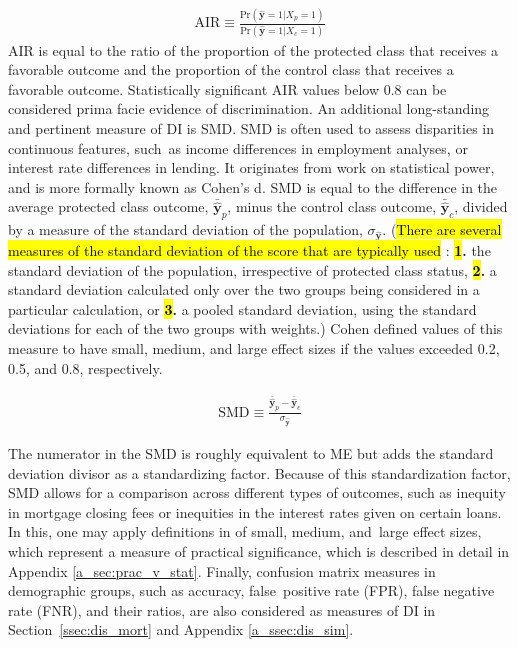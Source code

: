 \documentclass[information,article,accept,moreauthors,pdftex]{Definitions/mdpi}
\begin{document}
{{{\begin{equation}
\label{eq:air}
\begin{aligned}
\text{AIR} \equiv \frac{\text{Pr}(\hat{\mathbf{y}} = 1 | X_p = 1)}{\text{Pr}(\hat{\mathbf{y}} = 1| X_c = 1)}
\end{aligned}
\end{equation}
 AIR is equal to the ratio of the proportion of the protected class that receives a favorable outcome and the proportion of the control class that receives a favorable outcome. Statistically significant AIR values below 0.8 can be considered {prima facie} evidence of discrimination. An additional long-standing and pertinent measure of DI is SMD. SMD is often used to assess disparities in continuous features, such~as income differences in employment analyses, or interest rate differences in lending. It originates from work on statistical power, and is more formally known as {Cohen’s d}. SMD is equal to the difference in the average protected class outcome, $\bar{\hat{\mathbf{y}}}_p$, minus the control class outcome, $\bar{\hat{\mathbf{y}}}_c$, divided by a measure of the standard deviation of the population, $\sigma_{\hat{\mathbf{y}}}$. ({\hl{There are several measures of the standard deviation of the score that are typically used}%
: \textbf{\hl{1}.} the standard deviation of the population, irrespective of protected class status, \textbf{\hl{2}.} a standard deviation calculated only over the two groups being considered in a particular calculation, or \textbf{\hl{3}.} a pooled standard deviation, using the standard deviations for each of the two groups with weights.}) Cohen defined values of this measure to have {small}, {medium}, and {large} effect sizes if the values exceeded 0.2, 0.5, and 0.8, respectively. %

\begin{equation}
\label{eq:smd}
\begin{aligned}
\text{SMD} \equiv \frac{\bar{\hat{\mathbf{y}}}_p - \bar{\hat{\mathbf{y}}}_c}{ \sigma_{\hat{\mathbf{y}}}}
\end{aligned}
\end{equation}

 The numerator in the SMD is roughly equivalent to ME but adds the standard deviation divisor as a standardizing factor.  Because of this standardization factor, SMD allows for a comparison across different types of outcomes, such as inequity in mortgage closing fees or inequities in the interest rates given on certain loans.  In this, one may apply definitions in \citet{cohen1988statistical} of {small}, {medium}, and~{large} effect sizes, which represent a measure of {practical significance}, which is described in detail in Appendix \ref{a_sec:prac_v_stat}. Finally, confusion matrix measures in demographic groups, such as accuracy, false~positive rate (FPR), false negative rate (FNR), and their ratios, are also considered as measures of DI in Section~\ref{ssec:dis_mort} and Appendix \ref{a_ssec:dis_sim}.

}}}
\end{document}
